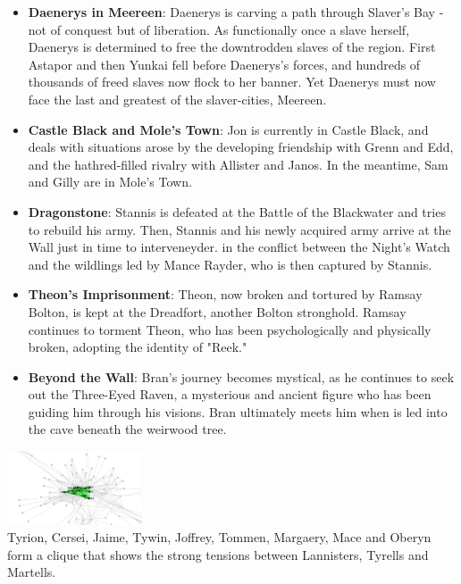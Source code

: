 \documentclass[10pt,twocolumn,letterpaper]{article}
\begin{document}
\begin{itemize}
    \item \textbf{Daenerys in Meereen}: Daenerys is carving a path through Slaver's Bay - not of conquest but of liberation. As functionally once a slave herself, Daenerys is determined to free the downtrodden slaves of the region. First Astapor and then Yunkai fell before Daenerys's forces, and hundreds of thousands of freed slaves now flock to her banner. Yet Daenerys must now face the last and greatest of the slaver-cities, Meereen.
    \item \textbf{Castle Black and Mole's Town}: Jon is currently in Castle Black, and deals with situations arose by the developing friendship with Grenn and Edd, and the hathred-filled rivalry with Allister and Janos. In the meantime, Sam and Gilly are in Mole's Town.
    \item \textbf{Dragonstone}: Stannis is defeated at the Battle of the Blackwater and tries to rebuild his army. Then, Stannis and his newly acquired army arrive at the Wall just in time to interveneyder. in the conflict between the Night's Watch and the wildlings led by Mance Rayder, who is then captured by Stannis.
    \item \textbf{Theon's Imprisonment}: Theon, now broken and tortured by Ramsay Bolton, is kept at the Dreadfort, another Bolton stronghold. Ramsay continues to torment Theon, who has been psychologically and physically broken, adopting the identity of "Reek."
    \item \textbf{Beyond the Wall}: Bran's journey becomes mystical, as he continues to seek out the Three-Eyed Raven, a mysterious and ancient figure who has been guiding him through his visions. Bran ultimately meets him when is led into the cave beneath the weirwood tree.
    
\end{itemize}

\begin{center}
    \includegraphics[width=0.3\textwidth]{img/s4/clique.jpg} \\
    \caption{\small{Tyrion, Cersei, Jaime, Tywin, Joffrey, Tommen, Margaery, Mace and Oberyn form a clique that shows the strong tensions between Lannisters, Tyrells and Martells.}}
\end{center}
\end{document}
